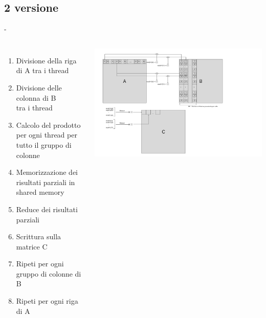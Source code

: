 \documentclass[compress]{beamer}
\begin{document}
\subsection{2 versione}
\begin{frame}{\secname \text{ }- \subsecname\ }
    \begin{columns}
        \begin{minipage}[b]{1\textwidth}
            \begin{enumerate}
                \item Divisione della riga di A tra i thread
                \item Divisione delle colonna di B \\tra i thread
                \item Calcolo del prodotto per ogni thread per tutto il gruppo di colonne
                \item Memorizzazione dei risultati parziali in shared memory
                \item Reduce dei risultati parziali 
                \item Scrittura sulla matrice C
                \item Ripeti per ogni gruppo di colonne di B
                \item Ripeti per ogni riga di A
            \end{enumerate}
        \end{minipage}
        \begin{minipage}{1.25\textwidth}
            \begin{adjustbox}{margin=0cm 0cm 0cm 0cm, center} %
                \includegraphics[width=1.2\textwidth]{resources/cuda_scheme_v2.png}
            \end{adjustbox}
        \end{minipage}
        
    \end{columns}
\end{frame}
\end{document}
